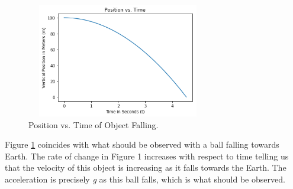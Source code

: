 \documentclass[twocolumn]{article}
\begin{document}
\begin{figure}[h]
    \centering
    \includegraphics[width=8cm, height=5cm]{Figures/1D Position Plot.png}
    \caption{\small{Position vs. Time of Object Falling.}}
    \label{Fig. 1D Position Plot}
\end{figure}
\par \noindent
Figure \ref{Fig. 1D Position Plot} coincides with what should be observed with a ball falling towards Earth. The rate of change in Figure 1 increases with respect to time telling us that the velocity of this object is increasing as it falls towards the Earth. The acceleration is precisely \textit{g} as this ball falls, which is what should be observed.
\end{document}
